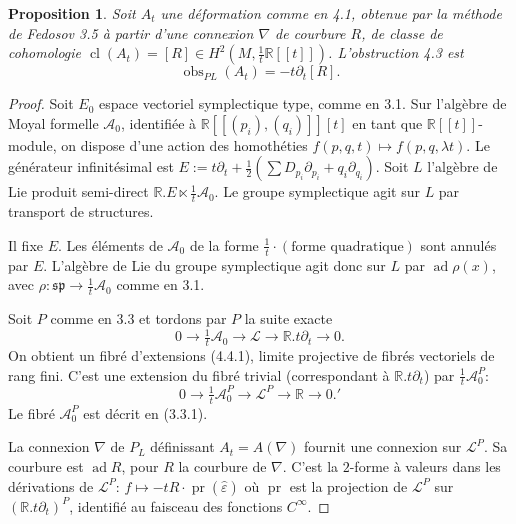 \documentclass[11pt,a4paper]{article}
\theoremstyle{plain}
\newtheorem{proposition}[theorem]{Proposition}
\theoremstyle{definition}
\DeclareMathOperator{\ad}{ad}
\DeclareMathOperator{\cl}{cl}
\DeclareMathOperator{\pr}{pr}
\DeclareMathOperator{\obs}{obs}
\newcommand{\R}{\mathbb{R}}
\begin{document}
\begin{proposition}
Soit $A_{t}$ une d\'eformation comme en 4.1, obtenue par la m\'ethode de Fedosov 3.5 \`a partir d'une connexion $\nabla$ de courbure $R$, de classe de cohomologie $\cl(A_{t}) = [R] \in H^{2}(M, \tfrac{1}{t}\R[[t]])$. L'obstruction 4.3 est
\[
\obs_{PL}(A_{t}) = -t\partial_{t}[R].
\]
\end{proposition}

\begin{proof}
Soit $E_{0}$ espace vectoriel symplectique type, comme en 3.1. Sur l'alg\`ebre
de Moyal formelle $\mathcal{A}_{0}$, identifi\'ee \`a $\R[[(p_{i}),(q_{i})]][t]$ en tant que $\R[[t]]$-module, on dispose d'une action des homoth\'eties $f(p,q,t) \mapsto f(p,q,\lambda t)$. Le g\'en\'erateur infinit\'esimal est $E := t\partial_{t} + \tfrac{1}{2}(\sum D_{p_{i}}\partial_{p_{i}} + q_{i}\partial_{q_{i}})$. Soit $L$ l'alg\`ebre de Lie produit semi-direct $\R.E \ltimes \tfrac{1}{t}\mathcal{A}_{0}$. Le groupe symplectique agit sur $L$ par transport de structures.

Il fixe $E$. Les \'el\'ements de $\mathcal{A}_{0}$ de la forme $\tfrac{1}{t} \cdot (\text{forme quadratique})$ sont annul\'es par $E$. L'alg\`ebre de Lie du groupe symplectique agit donc sur $L$ par $\ad \rho(x)$, avec $\rho: \mathfrak{sp} \to \tfrac{1}{t}\mathcal{A}_{0}$ comme en 3.1.

Soit $P$ comme en 3.3 et tordons par $P$ la suite exacte
\begin{equation}
0 \longrightarrow \tfrac{1}{t}\mathcal{A}_{0} \longrightarrow \mathcal{L} \longrightarrow \R.t\partial_{t} \longrightarrow 0. \tag{4.4.1}
\end{equation}
On obtient un fibr\'e d'extensions (4.4.1), limite projective de fibr\'es vectoriels de
rang fini. C'est une extension du fibr\'e trivial (correspondant \`a $\R.t\partial_{t}$) par $\tfrac{1}{t}\mathcal{A}_{0}^{P}$:
\begin{equation}
0 \longrightarrow \tfrac{1}{t}\mathcal{A}_{0}^{P} \longrightarrow \mathcal{L}^{P} \longrightarrow \R \longrightarrow 0. \tag{4.4.1}'
\end{equation}
Le fibr\'e $\mathcal{A}_{0}^{P}$ est d\'ecrit en (3.3.1).

La connexion $\nabla$ de $P_{L}$ d\'efinissant $A_{t} = A(\nabla)$ fournit une connexion sur $\mathcal{L}^{P}$.
Sa courbure est $\ad R$, pour $R$ la courbure de $\nabla$. C'est la $2$-forme \`a valeurs dans les d\'erivations de $\mathcal{L}^{P}$: $f \longmapsto -tR \cdot \pr(\hat{\varepsilon})$
o\`u $\pr$ est la projection de $\mathcal{L}^{P}$ sur $(\R.t\partial_{t})^{P}$, identifi\'e au faisceau des fonctions $C^{\infty}$.


\end{proof}
\end{document}
